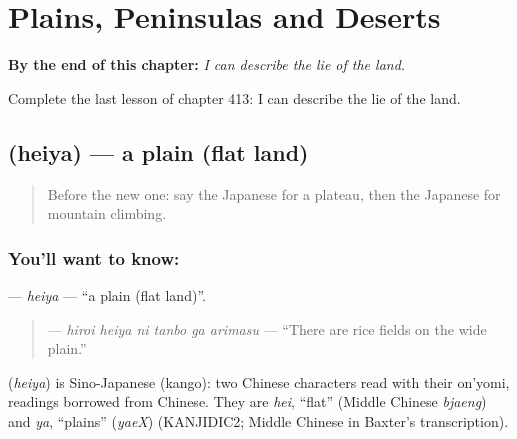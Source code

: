 
\chapter{Plains, Peninsulas and Deserts}
\label{ch:ja-plains-peninsulas-and-deserts}

\begin{chapteropening}
\textbf{By the end of this chapter:} \emph{I can describe the lie of the land.}

Complete the last lesson of chapter 413: I can describe the lie of the land.
\end{chapteropening}

\section[\texorpdfstring{\ja{へいや} (heiya)}{へいや (heiya)}]{ (heiya) — a plain (flat land)}

\label{lesson:JA-C413-heiya}



\begin{quote}
Before the new one: say the Japanese for a plateau, then the Japanese for mountain climbing.
\end{quote}

\subsection*{You'll want to know: }
\textbf{} — \emph{heiya} — \textquotedblleft{}a plain (flat land)\textquotedblright{}.

\begin{quote}
\textbf{   } — \emph{hiroi heiya ni tanbo ga arimasu} — \textquotedblleft{}There are rice fields on the wide plain.\textquotedblright{}
\end{quote}

\begin{cousinweb}
\textbf{} (\emph{heiya}) is Sino-Japanese (kango): two Chinese characters read with their on'yomi, readings borrowed from Chinese. They are \emph{hei}, \textquotedblleft{}flat\textquotedblright{} (Middle Chinese \emph{bjaeng}) and \emph{ya}, \textquotedblleft{}plains\textquotedblright{} (\emph{yaeX}) (KANJIDIC2; Middle Chinese in Baxter's transcription).
\end{cousinweb}

